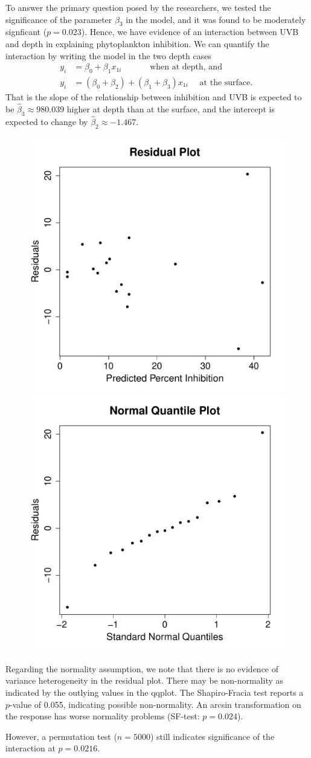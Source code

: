 \documentclass{homework}
\begin{document}
To answer the primary question posed by the researchers, we tested the significance of the parameter $\beta_3$ in the model, and it was found to be moderately signficant ($p = 0.023$). Hence, we have evidence of an interaction between UVB and depth in explaining phytoplankton inhibition.  We can quantify the interaction by writing the model in the two depth cases
\begin{align*}
  y_i &= \beta_0 + \beta_1 x_{1i} \quad\quad\quad\text{ when at depth, and }\\
  y_i &= (\beta_0 + \beta_2) + (\beta_1+ \beta_3)  x_{1i} \quad\text{ at the surface. }
\end{align*}
That is the slope of the relationship between inhibition and UVB is expected to
be $\hat\beta_3 \approx 980.039$ higher at depth than at the surface, and the
intercept is expected to change by $\hat\beta_2 \approx -1.467$.
\begin{figure}
\includegraphics[width=.25\textwidth]{ozone_resid.pdf}\includegraphics[width=.25\textwidth]{ozone_qqplot.pdf}
\end{figure}
Regarding the normality assumption, we note that there is no evidence of variance heterogeneity in the residual
plot.  There may be non-normality as indicated by the outlying values in the qqplot. The
Shapiro-Fracia test reports a $p$-value of 0.055, indicating possible
non-normality. An arcsin transformation on the response has worse normality problems (SF-test: $p=0.024$).

However, a permutation test ($n=5000$) still indicates significance of the interaction at $p = 0.0216$.
\end{document}
